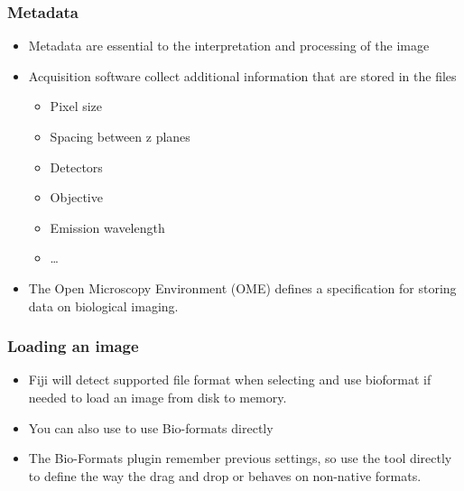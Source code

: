 \documentclass[ignorenonframetext,aspectratio=169,10pt,xcolor=table]{beamer}
\begin{document}
\begin{frame} \frametitle{Metadata}
  \begin {itemize}
  \item Metadata are essential to the interpretation and processing of
    the image
  \item Acquisition software collect additional information that are
    stored in the files
    \begin{itemize}
    \item Pixel size
    \item Spacing between z planes
    \item Detectors
    \item Objective
    \item Emission wavelength
    \item \dots
    \end{itemize}
  \item The Open Microscopy Environment (OME) defines a specification
    for storing data on biological imaging.
  \end{itemize} 
\end{frame}

\begin{frame} \frametitle{Loading an image}
  \begin{itemize}\setlength\itemsep{1em}
  \item Fiji will detect supported file format when selecting
     and use bioformat if needed to load an image from
    disk to memory.
  \item You can also use  to use Bio-formats directly
  \item The Bio-Formats plugin remember previous settings, so use
    the tool directly to define the way the drag and drop or
     behaves on non-native formats.
  \end{itemize}
\end{frame}
\end{document}
